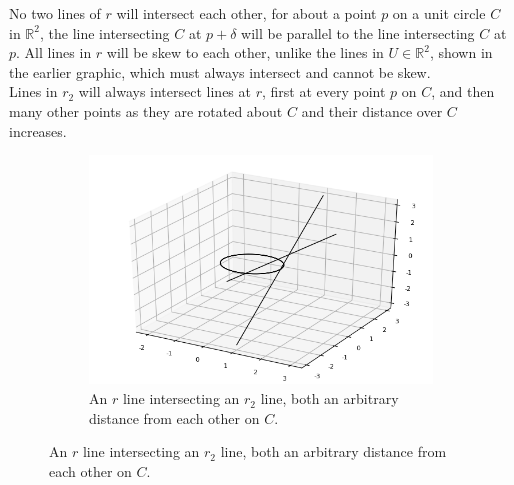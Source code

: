 \documentclass[12pt]{article}
\begin{document}
No two lines of $r$ will intersect each other, for about a point $p$ on a unit circle $C$ in $\mathbb{R}^2$, the line intersecting $C$ at $p+\delta$ will be parallel to the line intersecting $C$ at $p$. All lines in $r$ will be skew to each other, unlike the lines in $U \in \mathbb{R}^2$, shown in the earlier graphic, which must always intersect and cannot be skew.\\
\indent
Lines in $r_2$ will always intersect lines at $r$, first at every point $p$ on $C$, and then many other points as they are rotated about $C$ and their distance over $C$ increases.
\begin{figure}[h!]
  \centering
      \begin{subfigure}[b]{0.6\linewidth}
    \includegraphics[width=\linewidth]{./assets/4-1-3/hyperboloid-line-rotation-intersection.png}
    \caption*{An $r$ line intersecting an $r_2$ line, both an arbitrary distance from each other on $C$.}
  \end{subfigure}
  \end{figure}
\end{document}
